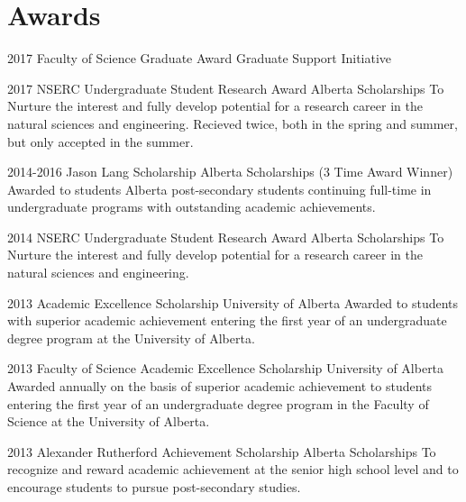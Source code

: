 \documentclass{friggeri-cv} %
\begin{document}
\newpage


\pagebreak[2]
\section{Awards}

\begin{entrylist}

\entry
{2017}
{Faculty of Science Graduate Award}
{Graduate Support Initiative}
{}


\entry
{2017}
{NSERC Undergraduate Student Research Award}
{Alberta Scholarships}
{To Nurture the interest and fully develop potential for a research career in the natural sciences and engineering. Recieved twice, both in the spring and summer, but only accepted in the summer.}

\entry
{2014-2016}
{Jason Lang Scholarship}
{Alberta Scholarships}
{(3 Time Award Winner) Awarded to students Alberta post-secondary students continuing full-time in undergraduate programs with outstanding academic achievements.}


\entry
{2014}
{NSERC Undergraduate Student Research Award}
{Alberta Scholarships}
{To Nurture the interest and fully develop potential for a research career in the natural sciences and engineering.}


\entry
{2013}
{Academic Excellence Scholarship}
{University of Alberta}
{Awarded to students with superior academic achievement entering the first year of an undergraduate degree program at the University of Alberta.}


\entry
{2013}
{Faculty of Science Academic Excellence Scholarship}
{University of Alberta}
{Awarded annually on the basis of superior academic achievement to students entering the first year of an undergraduate degree program in the Faculty of Science at the University of Alberta.}


\entry
{2013}
{Alexander Rutherford Achievement Scholarship}
{Alberta Scholarships}
{To recognize and reward academic achievement at the senior high school level and to encourage students to pursue post-secondary studies.}


\end{entrylist}
\end{document}
